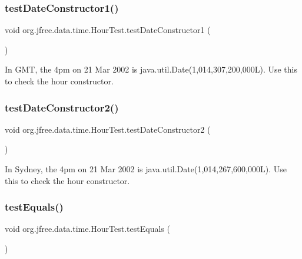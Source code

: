 \subsubsection{\texorpdfstring{test\+Date\+Constructor1()}{testDateConstructor1()}}
{\footnotesize\ttfamily void org.\+jfree.\+data.\+time.\+Hour\+Test.\+test\+Date\+Constructor1 (\begin{DoxyParamCaption}{ }\end{DoxyParamCaption})}

In G\+MT, the 4pm on 21 Mar 2002 is java.\+util.\+Date(1,014,307,200,000\+L). Use this to check the hour constructor. \mbox{\label{classorg_1_1jfree_1_1data_1_1time_1_1_hour_test_aa5ce292f0b31f4a2f91955d10be0a20a}} 
\subsubsection{\texorpdfstring{test\+Date\+Constructor2()}{testDateConstructor2()}}
{\footnotesize\ttfamily void org.\+jfree.\+data.\+time.\+Hour\+Test.\+test\+Date\+Constructor2 (\begin{DoxyParamCaption}{ }\end{DoxyParamCaption})}

In Sydney, the 4pm on 21 Mar 2002 is java.\+util.\+Date(1,014,267,600,000\+L). Use this to check the hour constructor. \mbox{\label{classorg_1_1jfree_1_1data_1_1time_1_1_hour_test_aa64fadb093fd88bdaa2d108e1800472a}} 
\subsubsection{\texorpdfstring{test\+Equals()}{testEquals()}}
{\footnotesize\ttfamily void org.\+jfree.\+data.\+time.\+Hour\+Test.\+test\+Equals (\begin{DoxyParamCaption}{ }\end{DoxyParamCaption})}

